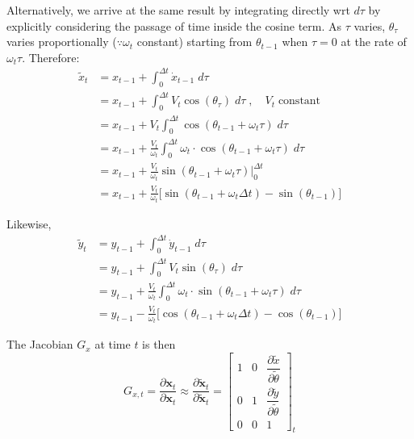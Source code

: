 \documentclass{article}
\begin{document}
\begin{enumerate}[label=(\roman*)]
Alternatively, we arrive at the same result by integrating directly wrt $d\tau$ by explicitly considering the passage of time inside the cosine term. As $\tau$ varies, $\theta_\tau$ varies proportionally ($\because\omega_t$ constant) starting from $\theta_{t-1}$ when $\tau=0$ at the rate of $\omega_t \tau$. Therefore:
\begin{equation}
\begin{aligned}
\tilde x_t &= x_{t-1} + \int_0^{\Delta t} \dot{x}_{t-1} \; d\tau \\
&= x_{t-1} + \int_0^{\Delta t} V_t \cos(\theta_\tau) \; d\tau \;,\quad V_t \; \text{constant} \\
&= x_{t-1} + V_t \int_0^{\Delta t} \cos(\theta_{t-1} + \omega_t\tau) \; d\tau \\
&= x_{t-1} + \frac{V_t}{\omega_t} \int_0^{\Delta t} \omega_t \cdot \cos(\theta_{t-1} + \omega_t\tau) \; d\tau \\
&= x_{t-1} + \frac{V_t}{\omega_t} \sin(\theta_{t-1} + \omega_t\tau) \Big\rvert_0^{\Delta t} \\
&= x_{t-1} + \frac{V_t}{\omega_t} \Big[ \sin(\theta_{t-1} + \omega_t\Delta t) - \sin(\theta_{t-1}) \Big]
\end{aligned}
\end{equation}

Likewise,
\begin{equation}
\begin{aligned}
\tilde y_t &= y_{t-1} + \int_0^{\Delta t} \dot{y}_{t-1} \; d\tau \\
&= y_{t-1} + \int_0^{\Delta t} V_t \sin(\theta_\tau) \; d\tau \\
&= y_{t-1} + \frac{V_t}{\omega_t} \int_0^{\Delta t} \omega_t \cdot \sin(\theta_{t-1} + \omega_t\tau) \; d\tau \\
&= y_{t-1} - \frac{V_t}{\omega_t} \Big[ \cos(\theta_{t-1} + \omega_t\Delta t) - \cos(\theta_{t-1}) \Big]
\end{aligned}
\end{equation}

The Jacobian $G_x$ at time $t$ is then
\begin{equation}
G_{x,t}
= \frac{\partial \mathbf{x}_t}{\partial \mathbf{x}_t}
\approx \frac{\partial \tilde{\mathbf{x}}_t}{\partial \tilde{\mathbf{x}}_t}
= \begin{bmatrix}
1 & 0 & \dfrac{\partial \tilde x}{\partial \tilde \theta} \\[6pt]
0 & 1 & \dfrac{\partial \tilde y}{\partial \tilde \theta} \\[6pt]
0 & 0 & 1
\end{bmatrix}_t
\end{equation}


\end{enumerate}
\end{document}
